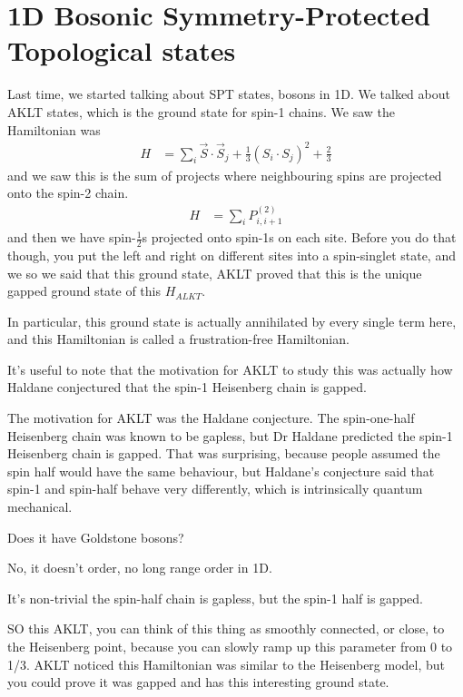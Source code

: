 \section{1D Bosonic Symmetry-Protected Topological states}
Last time,
we started talking about SPT states,
bosons in 1D.
We talked about AKLT states,
which is the ground state for spin-1 chains.
We saw the Hamiltonian was
\begin{align}
    H &= \sum_i \vec{S}\cdot\vec{S}_j
    + \frac{1}{3} \left( S_i \cdot S_j \right)^2 + \frac{2}{3}
\end{align}
and we saw this is the sum of projects where neighbouring spins are projected
onto the spin-2 chain.
\begin{align}
    H &= \sum_i P_{i,i+1}^{(2)}
\end{align}
and then we have spin-$\frac{1}{2}$s projected onto spin-1s on each site.
Before you do that though,
you put the left and right on different sites into a spin-singlet state,
and we so we said that this ground state,
AKLT proved that this is the unique gapped ground state
of this $H_{ALKT}$.

In particular, this ground state is actually annihilated by every single term
here,
and this Hamiltonian is called a frustration-free Hamiltonian.

It's useful to note that the motivation for AKLT to study this was actually how
Haldane conjectured that the spin-1 Heisenberg chain is gapped.

The motivation for AKLT was the Haldane conjecture.
The spin-one-half Heisenberg chain was known to be gapless,
but Dr Haldane predicted the spin-1 Heisenberg chain is gapped.
That was surprising,
because people assumed the spin half would have the same behaviour,
but Haldane's conjecture said that spin-1 and spin-half behave very
differently,
which is intrinsically quantum mechanical.

\begin{question}
    Does it have Goldstone bosons?
\end{question}
No, it doesn't order, no long range order in 1D.

It's non-trivial the spin-half chain is gapless,
but the  spin-1 half is gapped.

SO this AKLT,
you can think of this thing as smoothly connected,
or close,
to the Heisenberg point,
because you can slowly ramp up this parameter from 0 to 1/3.
AKLT noticed this Hamiltonian was similar to the Heisenberg model,
but you could prove it was gapped and has this interesting ground state.

